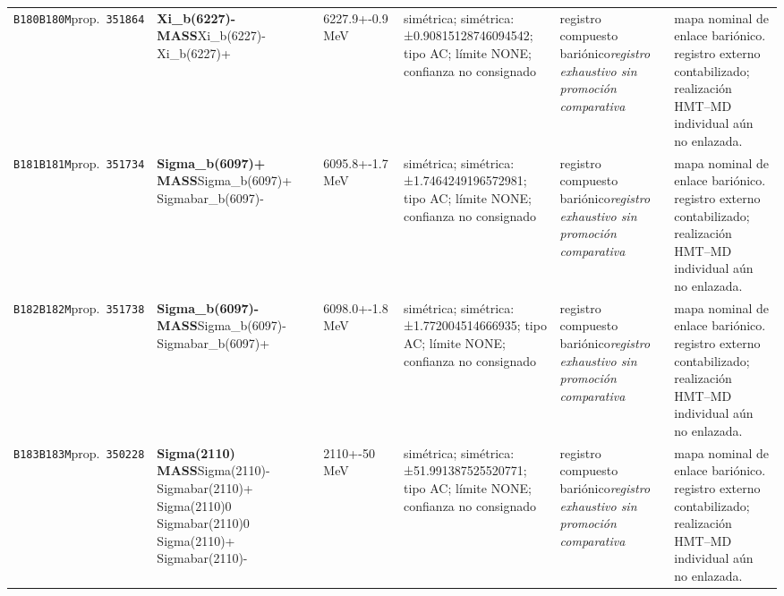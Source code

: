 \begin{landscape}
\begin{longtable}{L{1.85cm}L{4.45cm}L{2.35cm}L{4.05cm}L{3.35cm}L{7.15cm}}
\texttt{B180}\newline \texttt{B180M}\newline prop.\ \texttt{351864} & \textbf{Xi\_\allowbreak{}b(6227)- MASS}\newline Xi\_\allowbreak{}b(6227)- \textbar{}\allowbreak{} Xi\_\allowbreak{}b(6227)+ & 6227.9+-0.9\,MeV & simétrica; simétrica: ±0.90815128746094542; tipo AC; límite NONE; confianza no consignado & registro compuesto bariónico\newline \emph{registro exhaustivo sin promoción comparativa} & mapa nominal de enlace bariónico. registro externo contabilizado; realización HMT--MD individual aún no enlazada. \\
\texttt{B181}\newline \texttt{B181M}\newline prop.\ \texttt{351734} & \textbf{Sigma\_\allowbreak{}b(6097)+ MASS}\newline Sigma\_\allowbreak{}b(6097)+ \textbar{}\allowbreak{} Sigmabar\_\allowbreak{}b(6097)- & 6095.8+-1.7\,MeV & simétrica; simétrica: ±1.7464249196572981; tipo AC; límite NONE; confianza no consignado & registro compuesto bariónico\newline \emph{registro exhaustivo sin promoción comparativa} & mapa nominal de enlace bariónico. registro externo contabilizado; realización HMT--MD individual aún no enlazada. \\
\texttt{B182}\newline \texttt{B182M}\newline prop.\ \texttt{351738} & \textbf{Sigma\_\allowbreak{}b(6097)- MASS}\newline Sigma\_\allowbreak{}b(6097)- \textbar{}\allowbreak{} Sigmabar\_\allowbreak{}b(6097)+ & 6098.0+-1.8\,MeV & simétrica; simétrica: ±1.772004514666935; tipo AC; límite NONE; confianza no consignado & registro compuesto bariónico\newline \emph{registro exhaustivo sin promoción comparativa} & mapa nominal de enlace bariónico. registro externo contabilizado; realización HMT--MD individual aún no enlazada. \\
\texttt{B183}\newline \texttt{B183M}\newline prop.\ \texttt{350228} & \textbf{Sigma(2110) MASS}\newline Sigma(2110)- \textbar{}\allowbreak{} Sigmabar(2110)+ \textbar{}\allowbreak{} Sigma(2110)0 \textbar{}\allowbreak{} Sigmabar(2110)0 \textbar{}\allowbreak{} Sigma(2110)+ \textbar{}\allowbreak{} Sigmabar(2110)- & 2110+-50\,MeV & simétrica; simétrica: ±51.991387525520771; tipo AC; límite NONE; confianza no consignado & registro compuesto bariónico\newline \emph{registro exhaustivo sin promoción comparativa} & mapa nominal de enlace bariónico. registro externo contabilizado; realización HMT--MD individual aún no enlazada. \\

\end{longtable}
\end{landscape}

